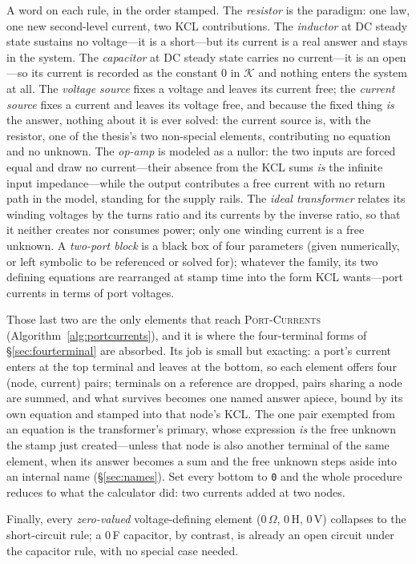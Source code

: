 \documentclass[11pt,oneside]{report}
\newcommand{\kw}[1]{\textsc{#1}}
\newcommand{\code}[1]{\texttt{#1}}
\begin{document}
A word on each rule, in the order stamped. The \emph{resistor} is the
paradigm: one law, one new second-level current, two KCL
contributions. The \emph{inductor} at DC steady state sustains no
voltage---it is a short---but its current is a real answer and stays
in the system. The \emph{capacitor} at DC steady state carries no
current---it is an open---so its current is recorded as the constant
$0$ in $\mathcal{K}$ and nothing enters the system at all. The
\emph{voltage source} fixes a voltage and leaves its current free; the
\emph{current source} fixes a current and leaves its voltage free, and
because the fixed thing \emph{is} the answer, nothing about it is ever
solved: the current source is, with the resistor, one of the thesis's
two non-special elements, contributing no equation and no unknown. The \emph{op-amp} is modeled as a nullor: the two inputs are
forced equal and draw no current---their absence from the KCL sums
\emph{is} the infinite input impedance---while the output contributes
a free current with no return path in the model, standing for the
supply rails. The \emph{ideal transformer} relates its winding
voltages by the turns ratio and its currents by the inverse ratio, so
that it neither creates nor consumes power; only one winding current
is a free unknown. A \emph{two-port block} is a black box of four
parameters (given numerically, or left symbolic to be referenced or
solved for); whatever the family, its two defining equations are
rearranged at stamp time into the form KCL wants---port currents in
terms of port voltages.

Those last two are the only elements that reach
\kw{Port-Currents} (Algorithm~\ref{alg:portcurrents}), and it is where
the four-terminal forms of \S\ref{sec:fourterminal} are absorbed. Its
job is small but exacting: a port's current enters at the top terminal
and leaves at the bottom, so each element offers four (node, current)
pairs; terminals on a reference are dropped, pairs sharing a node are
summed, and what survives becomes one named answer apiece, bound by
its own equation and stamped into that node's KCL. The one pair
exempted from an equation is the transformer's primary, whose
expression \emph{is} the free unknown the stamp just created---unless
that node is also another terminal of the same element, when its
answer becomes a sum and the free unknown steps aside into an internal
name (\S\ref{sec:names}). Set every bottom to \code{0} and the whole
procedure reduces to what the calculator did: two currents added at
two nodes.

Finally, every \emph{zero-valued}
voltage-defining element (0\,$\Omega$, 0\,H, 0\,V) collapses to the
short-circuit rule; a 0\,F capacitor, by contrast, is already an open
circuit under the capacitor rule, with no special case needed.
\end{document}
